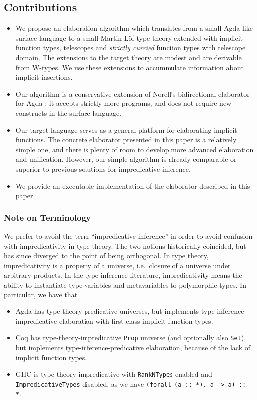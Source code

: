 \documentclass[acmsmall,review,anonymous,prologue,dvipsnames]{acmart}\settopmatter{printfolios=true,printccs=false,printacmref=false}
\begin{document}
\subsection{Contributions}
\begin{itemize}
  \item We propose an elaboration algorithm which translates from a small
    Agda-like surface language to a small Martin-L\"of type theory extended with
    implicit function types, telescopes and \emph{strictly curried} function
    types with telescope domain. The extensions to the target theory are modest
    and are derivable from W-types. We use these extensions to accummulate
    information about implicit insertions.
  \item Our algorithm is a conservative extension of Norell's bidirectional
    elaborator for Agda \cite[Chapter~3]{norell07thesis}; it accepts strictly more
    programs, and does not require new constructs in the surface language.
  \item Our target language serves as a general platform for elaborating
    implicit functions. The concrete elaborator presented in this paper is a
    relatively simple one, and there is plenty of room to develop more advanced
    elaboration and unification. However, our simple algorithm is already
    comparable or superior to previous solutions for impredicative inference.
  \item We provide an executable implementation of the elaborator described in
    this paper.
\end{itemize}

\subsubsection{Note on Terminology}

We prefer to avoid the term ``impredicative inference'' in order to avoid
confusion with impredicativity in type theory. The two notions historically
coincided, but has since diverged to the point of being orthogonal. In type
theory, impredicativity is a property of a universe, i.e.\ closure of a universe
under arbitrary products. In the type inference literature, impredicativity
means the ability to instantiate type variables and metavariables to polymorphic
types. In particular, we have that
\begin{itemize}
  \item Agda has type-theory-predicative universes, but implements
    type-inference-impredicative elaboration with first-class implicit function
    types.
  \item Coq has type-theory-impredicative \texttt{Prop} universe (and
    optionally also \texttt{Set}), but implements
    type-inference-predicative elaboration, because of the lack of implicit
    function types.
  \item GHC is type-theory-impredicative with \texttt{RankNTypes} enabled
    and \texttt{ImpredicativeTypes} disabled, as we have
    \texttt{(forall (a :: *). a -> a) :: *}.
\end{itemize}
\end{document}
